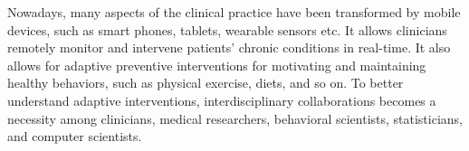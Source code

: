 Nowadays, many aspects of the clinical practice have been transformed by mobile devices, such as smart phones, tablets, wearable sensors etc. It allows clinicians remotely monitor and intervene patients’ chronic conditions in real-time. It also allows for adaptive preventive interventions for motivating and maintaining healthy behaviors, such as physical exercise, diets, and so on. To better understand adaptive interventions, interdisciplinary collaborations becomes a necessity among clinicians, medical researchers, behavioral scientists, statisticians, and computer scientists.\\





